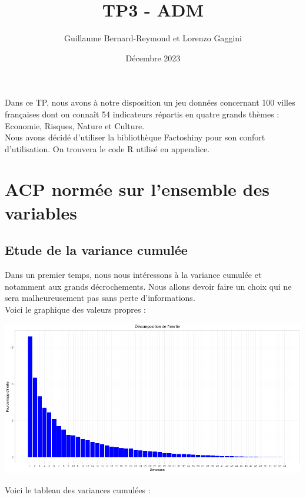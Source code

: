 \documentclass{article}
\title{TP3 - ADM}
\author{Guillaume Bernard-Reymond et Lorenzo Gaggini}
\date{Décembre 2023}
\begin{document}
\newcommand{\norme}[1]{\left\| #1\right\|}
\newcommand{\tr}{\text{tr}}
\maketitle
\setlength{\parindent}{0pt}

Dans ce TP, nous avons à notre disposition un jeu données concernant 100 villes françaises dont on connaît 54 indicateurs répartis en quatre grands thèmes : Economie, Risques, Nature et Culture.\\

Nous avons décidé d'utiliser la bibliothèque Factoshiny pour son confort d'utilisation. On trouvera le code R utilisé en appendice.

\section{ACP normée sur l'ensemble des variables}

\subsection{Etude de la variance cumulée}

Dans un premier temps, nous nous intéressons à la variance cumulée et notamment aux grands décrochements. Nous allons devoir faire un choix qui ne sera malheureusement pas sans perte d'informations.\\

Voici le graphique des valeurs propres : 

\centerline{\includegraphics[width=\linewidth]{images/ACP_vp}} 

Voici le tableau des variances cumulées :
\end{document}
